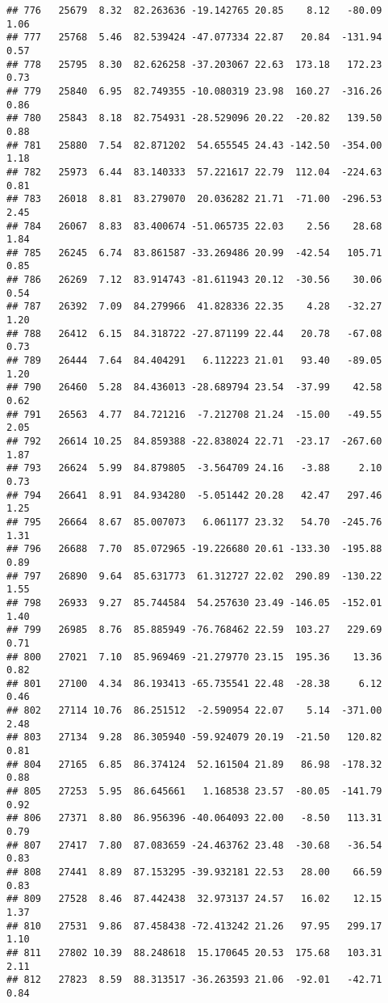 \documentclass[]{article}
\begin{document}
\begin{verbatim}
## 776   25679  8.32  82.263636 -19.142765 20.85    8.12   -80.09  1.06
## 777   25768  5.46  82.539424 -47.077334 22.87   20.84  -131.94  0.57
## 778   25795  8.30  82.626258 -37.203067 22.63  173.18   172.23  0.73
## 779   25840  6.95  82.749355 -10.080319 23.98  160.27  -316.26  0.86
## 780   25843  8.18  82.754931 -28.529096 20.22  -20.82   139.50  0.88
## 781   25880  7.54  82.871202  54.655545 24.43 -142.50  -354.00  1.18
## 782   25973  6.44  83.140333  57.221617 22.79  112.04  -224.63  0.81
## 783   26018  8.81  83.279070  20.036282 21.71  -71.00  -296.53  2.45
## 784   26067  8.83  83.400674 -51.065735 22.03    2.56    28.68  1.84
## 785   26245  6.74  83.861587 -33.269486 20.99  -42.54   105.71  0.85
## 786   26269  7.12  83.914743 -81.611943 20.12  -30.56    30.06  0.54
## 787   26392  7.09  84.279966  41.828336 22.35    4.28   -32.27  1.20
## 788   26412  6.15  84.318722 -27.871199 22.44   20.78   -67.08  0.73
## 789   26444  7.64  84.404291   6.112223 21.01   93.40   -89.05  1.20
## 790   26460  5.28  84.436013 -28.689794 23.54  -37.99    42.58  0.62
## 791   26563  4.77  84.721216  -7.212708 21.24  -15.00   -49.55  2.05
## 792   26614 10.25  84.859388 -22.838024 22.71  -23.17  -267.60  1.87
## 793   26624  5.99  84.879805  -3.564709 24.16   -3.88     2.10  0.73
## 794   26641  8.91  84.934280  -5.051442 20.28   42.47   297.46  1.25
## 795   26664  8.67  85.007073   6.061177 23.32   54.70  -245.76  1.31
## 796   26688  7.70  85.072965 -19.226680 20.61 -133.30  -195.88  0.89
## 797   26890  9.64  85.631773  61.312727 22.02  290.89  -130.22  1.55
## 798   26933  9.27  85.744584  54.257630 23.49 -146.05  -152.01  1.40
## 799   26985  8.76  85.885949 -76.768462 22.59  103.27   229.69  0.71
## 800   27021  7.10  85.969469 -21.279770 23.15  195.36    13.36  0.82
## 801   27100  4.34  86.193413 -65.735541 22.48  -28.38     6.12  0.46
## 802   27114 10.76  86.251512  -2.590954 22.07    5.14  -371.00  2.48
## 803   27134  9.28  86.305940 -59.924079 20.19  -21.50   120.82  0.81
## 804   27165  6.85  86.374124  52.161504 21.89   86.98  -178.32  0.88
## 805   27253  5.95  86.645661   1.168538 23.57  -80.05  -141.79  0.92
## 806   27371  8.80  86.956396 -40.064093 22.00   -8.50   113.31  0.79
## 807   27417  7.80  87.083659 -24.463762 23.48  -30.68   -36.54  0.83
## 808   27441  8.89  87.153295 -39.932181 22.53   28.00    66.59  0.83
## 809   27528  8.46  87.442438  32.973137 24.57   16.02    12.15  1.37
## 810   27531  9.86  87.458438 -72.413242 21.26   97.95   299.17  1.10
## 811   27802 10.39  88.248618  15.170645 20.53  175.68   103.31  2.11
## 812   27823  8.59  88.313517 -36.263593 21.06  -92.01   -42.71  0.84

\end{verbatim}
\end{document}
